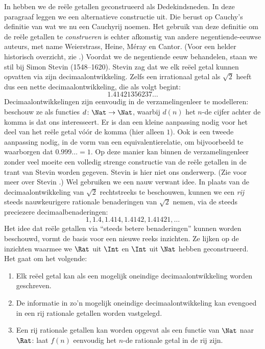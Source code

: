 \documentclass[../../../include/open-logic-section]{subfiles}
\begin{document}
In  hebben we de reële getallen geconstrueerd als
Dedekindsneden. In deze paragraaf leggen we een alternatieve
constructie uit. Die berust op Cauchy's definitie van wat we nu een
Cauchyrij noemen. Het gebruik van deze definitie om de reële getallen
te \emph{construeren} is echter afkomstig van andere negentiende-eeuwse
auteurs, met name Weierstrass, Heine, M\'{e}ray en Cantor. (Voor een
helder historisch overzicht, zie \citeauthor{OConnorRobertson:RN}
\citeyear{OConnorRobertson:RN}.)
Voordat we de negentiende eeuw behandelen, staan we stil bij Simon
Stevin (1548--1620). Stevin zag dat we elk reëel getal kunnen opvatten
via zijn decimaalontwikkeling. Zelfs een irrationaal getal als
$\sqrt{2}$ heeft dus een nette decimaalontwikkeling, die als volgt
begint:
\[
	1.41421356237\ldots
\] 
Decimaalontwikkelingen zijn eenvoudig in de verzamelingenleer te
modelleren: beschouw ze als functies $d \colon \Nat \to \Nat$, waarbij
$d(n)$ het $n$-de cijfer achter de komma is dat ons interesseert. Er is
dan een kleine aanpassing nodig voor het deel van het reële getal vóór
de komma (hier alleen $1$). Ook is een tweede aanpassing nodig, in de
vorm van een equivalentierelatie, om bijvoorbeeld te waarborgen dat
$0.999\ldots = 1$. Op deze manier kan binnen de verzamelingenleer zonder
veel moeite een volledig strenge constructie van de reële getallen in
de trant van Stevin worden gegeven.
Stevin is hier niet ons onderwerp. (Zie voor meer over Stevin
\citealt{KatzKatz2012}.) Wel gebruiken we een nauw verwant idee. In
plaats van de decimaalontwikkeling van $\sqrt{2}$ rechtstreeks te
beschouwen, kunnen we een \emph{rij} steeds nauwkeurigere rationale
benaderingen van $\sqrt{2}$ nemen, via de steeds preciezere
decimaalbenaderingen:
\[
1, 1.4, 1.414, 1.4142, 1.41421,\ldots
\]
Het idee dat reële getallen via ``steeds betere benaderingen'' kunnen
worden beschouwd, vormt de basis voor een nieuwe reeks inzichten. Ze
lijken op de inzichten waarmee we $\Rat$ uit $\Int$ en $\Int$ uit
$\Nat$ hebben geconstrueerd. Het gaat om het volgende:
\begin{enumerate}
	\item Elk reëel getal kan als een mogelijk oneindige
	decimaalontwikkeling worden geschreven.
	\item De informatie in zo'n mogelijk oneindige decimaalontwikkeling
	kan evengoed in een rij rationale getallen worden vastgelegd.
	\item Een rij rationale getallen kan worden opgevat als een functie
	van $\Nat$ naar $\Rat$: laat $f(n)$ eenvoudig het $n$-de rationale
	getal in de rij zijn.
\end{enumerate}
\end{document}
